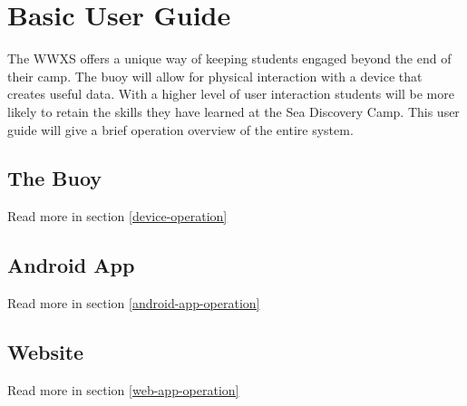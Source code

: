 \section{Basic User Guide}
The WWXS offers a unique way of keeping students engaged beyond the end of their camp. The buoy will allow for physical interaction with a device that creates useful data. With a higher level of user interaction students will be more likely to retain the skills they have learned at the Sea Discovery Camp. This user guide will give a brief operation overview of the entire system.
\subsection{The Buoy}

Read more in section \ref{device-operation}
\subsection{Android App}

Read more in section \ref{android-app-operation}
\subsection{Website}

Read more in section \ref{web-app-operation}